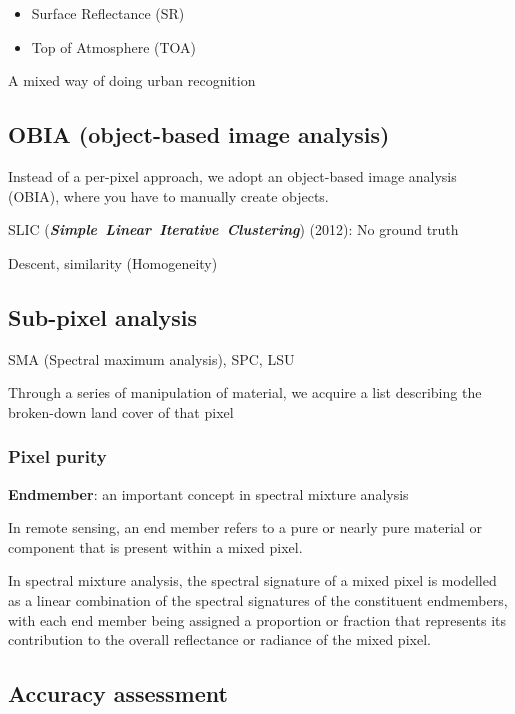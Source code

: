 \documentclass[
  letterpaper,
  DIV=11,
  numbers=noendperiod]{scrreprt}
\begin{document}
\begin{itemize}
\item
  Surface Reflectance (SR)
\item
  Top of Atmosphere (TOA)
\end{itemize}

A mixed way of doing urban recognition

\hypertarget{obia-object-based-image-analysis}{%
\subsection{OBIA (object-based image
analysis)}\label{obia-object-based-image-analysis}}

Instead of a per-pixel approach, we adopt an object-based image analysis
(OBIA), where you have to manually create objects.

SLIC (\textbf{\emph{Simple~Linear~Iterative~Clustering}}) (2012): No
ground truth

Descent, similarity (Homogeneity)

\hypertarget{sub-pixel-analysis}{%
\subsection{Sub-pixel analysis}\label{sub-pixel-analysis}}

SMA (Spectral maximum analysis), SPC, LSU

Through a series of manipulation of material, we acquire a list
describing the broken-down land cover of that pixel

\hypertarget{pixel-purity}{%
\subsubsection{Pixel purity}\label{pixel-purity}}

\textbf{Endmember}: an important concept in spectral mixture analysis

In remote sensing, an end member refers to a pure or nearly pure
material or component that is present within a mixed pixel.

In spectral mixture analysis, the spectral signature of a mixed pixel is
modelled as a linear combination of the spectral signatures of the
constituent endmembers, with each end member being assigned a proportion
or fraction that represents its contribution to the overall reflectance
or radiance of the mixed pixel.

\hypertarget{accuracy-assessment}{%
\subsection{Accuracy assessment}\label{accuracy-assessment}}
\end{document}
